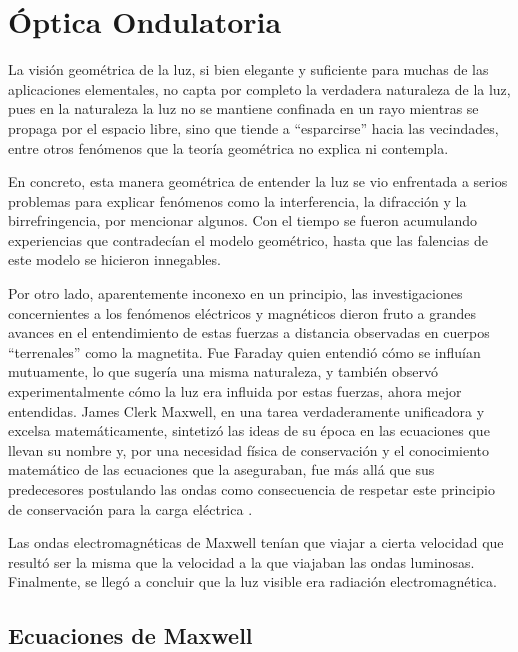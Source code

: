 \chapter{Óptica Ondulatoria}
\label{ch:ondulatoria}


La visión geométrica de la luz, si bien elegante y suficiente para muchas de las aplicaciones elementales, no capta por completo la verdadera naturaleza de la luz, pues en la naturaleza la luz no se mantiene confinada en un rayo mientras se propaga por el espacio libre, sino que tiende a ``esparcirse'' hacia las vecindades, entre otros fenómenos que la teoría geométrica no explica ni contempla.

En concreto, esta manera geométrica de entender la luz se vio enfrentada a serios problemas para explicar fenómenos como la interferencia, la difracción y la birrefringencia, por mencionar algunos. Con el tiempo se fueron acumulando experiencias que contradecían el modelo geométrico, hasta que las falencias de este modelo se hicieron innegables.

Por otro lado, aparentemente inconexo en un principio, las investigaciones concernientes a los fenómenos eléctricos y magnéticos dieron fruto a grandes avances en el entendimiento de estas fuerzas a distancia observadas en cuerpos ``terrenales'' como la magnetita. Fue Faraday quien entendió cómo se influían mutuamente, lo que sugería una misma naturaleza, y también observó experimentalmente cómo la luz era influida por estas fuerzas, ahora mejor entendidas. James Clerk Maxwell, en una tarea verdaderamente unificadora y excelsa matemáticamente, sintetizó las ideas de su época en las ecuaciones que llevan su nombre y, por una necesidad física de conservación y el conocimiento matemático de las ecuaciones que la aseguraban, fue más allá que sus predecesores postulando las ondas como consecuencia de respetar este principio de conservación para la carga eléctrica \cite{maxwell1865}.

Las ondas electromagnéticas de Maxwell tenían que viajar a cierta velocidad que resultó ser la misma que la velocidad a la que viajaban las ondas luminosas. 
Finalmente, se llegó a concluir que la luz visible era radiación electromagnética. 



\section{Ecuaciones de Maxwell}

